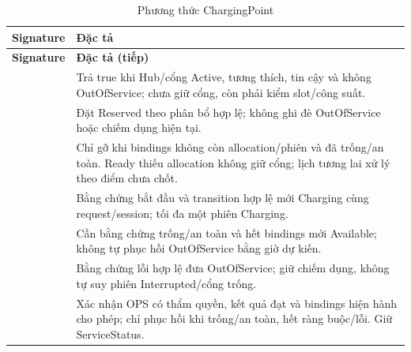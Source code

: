 \begin{longtable}{|L{58mm}|L{81mm}|}
\caption{Phương thức ChargingPoint}\\\hline
\textbf{Signature} & \textbf{Đặc tả}\\\hline
\endfirsthead
\hline\textbf{Signature} & \textbf{Đặc tả (tiếp)}\\\hline\endhead
{} & Trả true khi Hub/cổng Active, tương thích, tin cậy và không OutOfService; chưa giữ cổng, còn phải kiểm slot/công suất.\\\hline
{} & Đặt Reserved theo phân bổ hợp lệ; không ghi đè OutOfService hoặc chiếm dụng hiện tại.\\\hline
{} & Chỉ gỡ khi bindings không còn allocation/phiên và đã trống/an toàn. Ready thiếu allocation không giữ cổng; lịch tương lai xử lý theo điểm chưa chốt.\\\hline
{} & Bằng chứng bắt đầu và transition hợp lệ mới Charging cùng request/session; tối đa một phiên Charging.\\\hline
{} & Cần bằng chứng trống/an toàn và hết bindings mới Available; không tự phục hồi OutOfService bằng giờ dự kiến.\\\hline
{} & Bằng chứng lỗi hợp lệ đưa OutOfService; giữ chiếm dụng, không tự suy phiên Interrupted/cổng trống.\\\hline
{} & Xác nhận OPS có thẩm quyền, kết quả đạt và bindings hiện hành cho phép; chỉ phục hồi khi trống/an toàn, hết ràng buộc/lỗi. Giữ ServiceStatus.\\\hline
\end{longtable}
